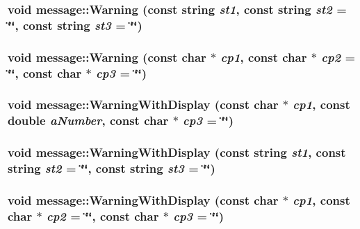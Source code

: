 \label{classmessage_a0ba3b49320345b5056b1321fe4f6f65e}
\hypertarget{classmessage_a085906fc256d250ccff79ea965c076cb}{
\subsubsection[{Warning}]{\setlength{\rightskip}{0pt plus 5cm}void message::Warning (const string {\em st1}, \/  const string {\em st2} = {\ttfamily \char`\"{}\char`\"{}}, \/  const string {\em st3} = {\ttfamily \char`\"{}\char`\"{}})}}
\label{classmessage_a085906fc256d250ccff79ea965c076cb}
\hypertarget{classmessage_aacaa1466698a349689502491cf089f72}{
\subsubsection[{Warning}]{\setlength{\rightskip}{0pt plus 5cm}void message::Warning (const char $\ast$ {\em cp1}, \/  const char $\ast$ {\em cp2} = {\ttfamily \char`\"{}\char`\"{}}, \/  const char $\ast$ {\em cp3} = {\ttfamily \char`\"{}\char`\"{}})}}
\label{classmessage_aacaa1466698a349689502491cf089f72}
\hypertarget{classmessage_a1b81970a0e394e69f98825fcc48a0cf7}{
\subsubsection[{WarningWithDisplay}]{\setlength{\rightskip}{0pt plus 5cm}void message::WarningWithDisplay (const char $\ast$ {\em cp1}, \/  const double {\em aNumber}, \/  const char $\ast$ {\em cp3} = {\ttfamily \char`\"{}\char`\"{}})}}
\label{classmessage_a1b81970a0e394e69f98825fcc48a0cf7}
\hypertarget{classmessage_ae2bc870036a86a3301ccc6232f1e424d}{
\subsubsection[{WarningWithDisplay}]{\setlength{\rightskip}{0pt plus 5cm}void message::WarningWithDisplay (const string {\em st1}, \/  const string {\em st2} = {\ttfamily \char`\"{}\char`\"{}}, \/  const string {\em st3} = {\ttfamily \char`\"{}\char`\"{}})}}
\label{classmessage_ae2bc870036a86a3301ccc6232f1e424d}
\hypertarget{classmessage_afed66d0552f90b4385c5169cf5929907}{
\subsubsection[{WarningWithDisplay}]{\setlength{\rightskip}{0pt plus 5cm}void message::WarningWithDisplay (const char $\ast$ {\em cp1}, \/  const char $\ast$ {\em cp2} = {\ttfamily \char`\"{}\char`\"{}}, \/  const char $\ast$ {\em cp3} = {\ttfamily \char`\"{}\char`\"{}})}}
\label{classmessage_afed66d0552f90b4385c5169cf5929907}



